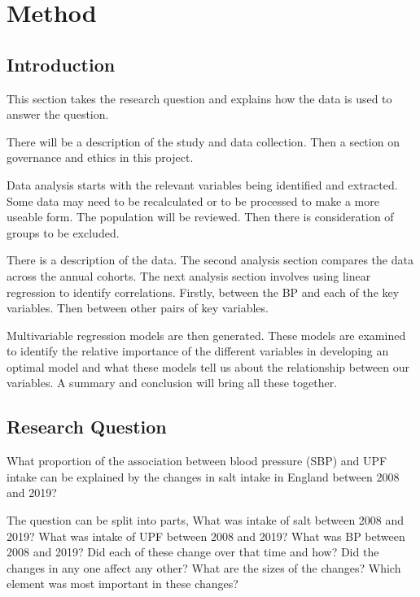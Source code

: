 \documentclass[
]{article}
\begin{document}
\newpage

\hypertarget{method}{%
\section{Method}\label{method}}

\hypertarget{introduction-2}{%
\subsection{Introduction}\label{introduction-2}}

This section takes the research question and explains how the data is
used to answer the question.

There will be a description of the study and data collection. Then a
section on governance and ethics in this project.

Data analysis starts with the relevant variables being identified and
extracted. Some data may need to be recalculated or to be processed to
make a more useable form. The population will be reviewed. Then there is
consideration of groups to be excluded.

There is a description of the data. The second analysis section compares
the data across the annual cohorts. The next analysis section involves
using linear regression to identify correlations. Firstly, between the
BP and each of the key variables. Then between other pairs of key
variables.

Multivariable regression models are then generated. These models are
examined to identify the relative importance of the different variables
in developing an optimal model and what these models tell us about the
relationship between our variables. A summary and conclusion will bring
all these together.

\hypertarget{research-question}{%
\subsection{Research Question}\label{research-question}}

What proportion of the association between blood pressure (SBP) and UPF
intake can be explained by the changes in salt intake in England between
2008 and 2019?

The question can be split into parts, What was intake of salt between
2008 and 2019? What was intake of UPF between 2008 and 2019? What was BP
between 2008 and 2019? Did each of these change over that time and how?
Did the changes in any one affect any other? What are the sizes of the
changes? Which element was most important in these changes?
\end{document}
